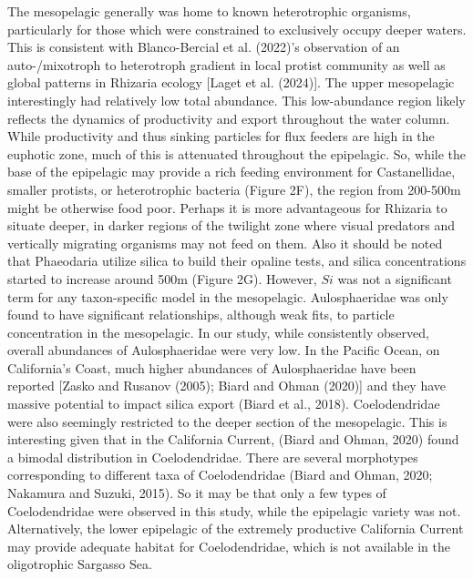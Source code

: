 \documentclass[
]{article}
\begin{document}
The mesopelagic generally was home to known heterotrophic organisms,
particularly for those which were constrained to exclusively occupy
deeper waters. This is consistent with Blanco-Bercial et al. (2022)'s
observation of an auto-/mixotroph to heterotroph gradient in local
protist community as well as global patterns in Rhizaria ecology
{[}Laget et al. (2024){]}. The upper mesopelagic interestingly had
relatively low total abundance. This low-abundance region likely
reflects the dynamics of productivity and export throughout the water
column. While productivity and thus sinking particles for flux feeders
are high in the euphotic zone, much of this is attenuated throughout the
epipelagic. So, while the base of the epipelagic may provide a rich
feeding environment for Castanellidae, smaller protists, or
heterotrophic bacteria (Figure 2F), the region from 200-500m might be
otherwise food poor. Perhaps it is more advantageous for Rhizaria to
situate deeper, in darker regions of the twilight zone where visual
predators and vertically migrating organisms may not feed on them. Also
it should be noted that Phaeodaria utilize silica to build their opaline
tests, and silica concentrations started to increase around 500m (Figure
2G). However, \(Si\) was not a significant term for any taxon-specific
model in the mesopelagic. Aulosphaeridae was only found to have
significant relationships, although weak fits, to particle concentration
in the mesopelagic. In our study, while consistently observed, overall
abundances of Aulosphaeridae were very low. In the Pacific Ocean, on
California's Coast, much higher abundances of Aulosphaeridae have been
reported {[}Zasko and Rusanov (2005); Biard and Ohman (2020){]} and they
have massive potential to impact silica export (Biard et al., 2018).
Coelodendridae were also seemingly restricted to the deeper section of
the mesopelagic. This is interesting given that in the California
Current, (Biard and Ohman, 2020) found a bimodal distribution in
Coelodendridae. There are several morphotypes corresponding to different
taxa of Coelodendridae (Biard and Ohman, 2020; Nakamura and Suzuki,
2015). So it may be that only a few types of Coelodendridae were
observed in this study, while the epipelagic variety was not.
Alternatively, the lower epipelagic of the extremely productive
California Current may provide adequate habitat for Coelodendridae,
which is not available in the oligotrophic Sargasso Sea.
\end{document}
